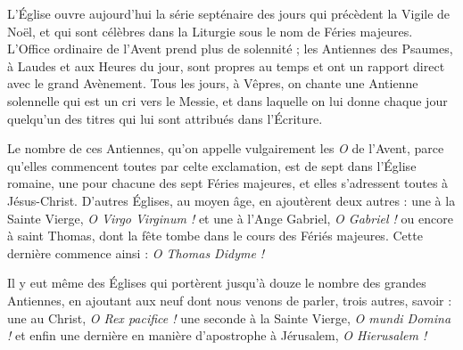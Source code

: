 \documentclass[%
fontsize=10%
,a6paper%
,DIV=15%
]{scrartcl}
\title{\centrer{Grandes Antiennes de l'Avent}}
\author{ou Antiennes O}
\date{du 17 au 23 décembre}
\begin{document}
    \newfontfamily{}
    \def\gretextformat#1{{\fontsize{\taillepolice}{\taillepolice}\selectfont #1}}
    \def\greinitialformat#1{{\lettrines #1}}
    \redlines
\newcommand{\ligne}[2]{
\begin{center}
\greseparator{#1}{#2}
\end{center}
}
\thispagestyle{empty}
\maketitle
\thispagestyle{empty}

L’Église ouvre aujourd’hui la série septénaire des jours qui précèdent la Vigile de Noël, et qui sont célèbres dans la Liturgie sous le nom de Féries majeures. L’Office ordinaire de l’Avent prend plus de solennité ; les Antiennes des Psaumes, à Laudes et aux Heures du jour, sont propres au temps et ont un rapport direct avec le grand Avènement. Tous les jours, à Vêpres, on chante une Antienne solennelle qui est un cri vers le Messie, et dans laquelle on lui donne chaque jour quelqu’un des titres qui lui sont attribués dans l’Écriture.

Le nombre de ces Antiennes, qu’on appelle vulgairement les \emph{O} de l’Avent, parce qu’elles commencent toutes par celte exclamation, est de sept dans l’Église romaine, une pour chacune des sept Féries majeures, et elles s’adressent toutes à Jésus-Christ. D’autres Églises, au moyen âge, en ajoutèrent deux autres : une à la Sainte Vierge, \emph{O Virgo Virginum !} et une à l’Ange Gabriel, \emph{O Gabriel !} ou encore à saint Thomas, dont la fête tombe dans le cours des Fériés majeures. Cette dernière commence ainsi : \emph{O Thomas Didyme !}

Il y eut même des Églises qui portèrent jusqu’à douze le nombre des grandes Antiennes, en ajoutant aux neuf dont nous venons de parler, trois autres, savoir : une au Christ, \emph{O Rex pacifice !} une seconde à la Sainte Vierge, \emph{O mundi Domina !} et enfin une dernière en manière d’apostrophe à Jérusalem, \emph{O Hierusalem !}
\end{document}
